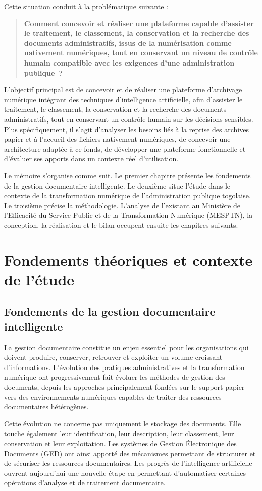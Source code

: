 \documentclass[12pt,a4paper]{report}
\newcommand{\nomMinistere}{Ministère de l'Efficacité du Service Public et de la Transformation Numérique (MESPTN)}
\newcommand{\problematiqueMemoire}{Comment concevoir et réaliser une plateforme capable d'assister le traitement, le classement, la conservation et la recherche des documents administratifs, issus de la numérisation comme nativement numériques, tout en conservant un niveau de contrôle humain compatible avec les exigences d'une administration publique~?}
\begin{document}
Cette situation conduit à la problématique suivante :

\begin{quote}
\textbf{\problematiqueMemoire}
\end{quote}

L'objectif principal est de concevoir et de réaliser une plateforme d'archivage numérique intégrant des techniques d'intelligence artificielle, afin d'assister le traitement, le classement, la conservation et la recherche des documents administratifs, tout en conservant un contrôle humain sur les décisions sensibles. Plus spécifiquement, il s'agit d'analyser les besoins liés à la reprise des archives papier et à l'accueil des fichiers nativement numériques, de concevoir une architecture adaptée à ce fonds, de développer une plateforme fonctionnelle et d'évaluer ses apports dans un contexte réel d'utilisation.

Le mémoire s'organise comme suit. Le premier chapitre présente les fondements de la gestion documentaire intelligente. Le deuxième situe l'étude dans le contexte de la transformation numérique de l'administration publique togolaise. Le troisième précise la méthodologie. L'analyse de l'existant au \nomMinistere{}, la conception, la réalisation et le bilan occupent ensuite les chapitres suivants.

\part{Fondements théoriques et contexte de l'étude}
\thispagestyle{plain}
\chapter[Fondements de la gestion documentaire]{Fondements de la gestion documentaire intelligente}
\label{ch:fondements}
La gestion documentaire constitue un enjeu essentiel pour les organisations qui doivent produire, conserver, retrouver et exploiter un volume croissant d'informations. L'évolution des pratiques administratives et la transformation numérique ont progressivement fait évoluer les méthodes de gestion des documents, depuis les approches principalement fondées sur le support papier vers des environnements numériques capables de traiter des ressources documentaires hétérogènes.

Cette évolution ne concerne pas uniquement le stockage des documents. Elle touche également leur identification, leur description, leur classement, leur conservation et leur exploitation. Les systèmes de Gestion Électronique des Documents (GED) ont ainsi apporté des mécanismes permettant de structurer et de sécuriser les ressources documentaires. Les progrès de l'intelligence artificielle ouvrent aujourd'hui une nouvelle étape en permettant d'automatiser certaines opérations d'analyse et de traitement documentaire.
\end{document}
